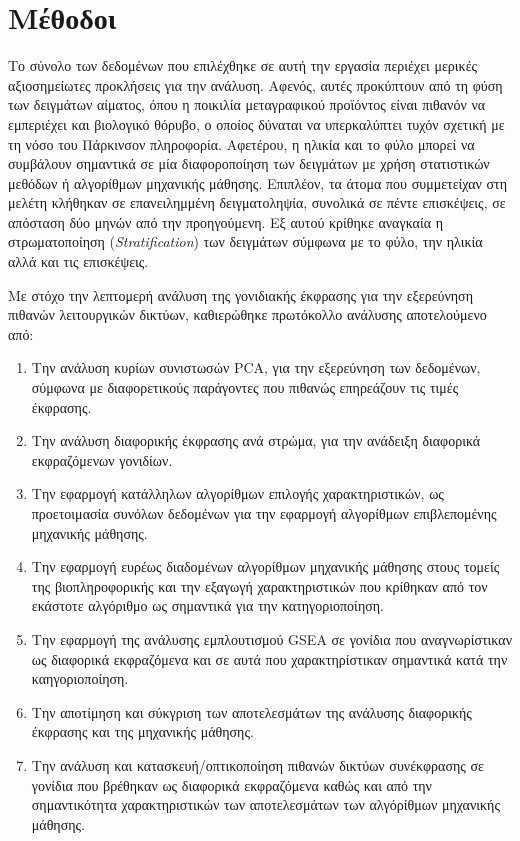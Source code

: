 \documentclass[12pt]{report}
\begin{document}
    \section{Μέθοδοι}
        \par
            Το σύνολο των δεδομένων που επιλέχθηκε σε αυτή την εργασία περιέχει μερικές αξιοσημείωτες προκλήσεις για την ανάλυση. Αφενός, αυτές προκύπτουν από τη φύση των δειγμάτων αίματος, όπου η ποικιλία μεταγραφικού προϊόντος είναι πιθανόν να εμπεριέχει και βιολογικό θόρυβο, ο οποίος δύναται να υπερκαλύπτει τυχόν σχετική με τη νόσο του Πάρκινσον πληροφορία. Αφετέρου, η ηλικία και το φύλο μπορεί να συμβάλουν σημαντικά σε μία διαφοροποίηση των δειγμάτων με χρήση στατιστικών μεθόδων ή αλγορίθμων μηχανικής μάθησης. Επιπλέον, τα άτομα που συμμετείχαν στη μελέτη κλήθηκαν σε επανειλημμένη δειγματοληψία, συνολικά σε πέντε επισκέψεις, σε απόσταση δύο μηνών από την προηγούμενη. Εξ αυτού κρίθηκε αναγκαία η στρωματοποίηση (\emph{Stratification}) των δειγμάτων σύμφωνα με το φύλο, την ηλικία αλλά και τις επισκέψεις.
        \par
            Με στόχο την λεπτομερή ανάλυση της γονιδιακής έκφρασης για την εξερεύνηση πιθανών λειτουργικών δικτύων, καθιερώθηκε πρωτόκολλο ανάλυσης αποτελούμενο από:
            \begin{enumerate}
                \item Την ανάλυση κυρίων συνιστωσών PCA, για την εξερεύνηση των δεδομένων, σύμφωνα με διαφορετικούς παράγοντες που πιθανώς επηρεάζουν τις τιμές έκφρασης.
                \item Την ανάλυση διαφορικής έκφρασης ανά στρώμα, για την ανάδειξη διαφορικά εκφραζόμενων γονιδίων.
                \item Την εφαρμογή κατάλληλων αλγορίθμων επιλογής χαρακτηριστικών, ως προετοιμασία συνόλων δεδομένων για την εφαρμογή αλγορίθμων επιβλεπομένης μηχανικής μάθησης.
                \item Την εφαρμογή ευρέως διαδομένων αλγορίθμων μηχανικής μάθησης στους τομείς της βιοπληροφορικής και την εξαγωγή χαρακτηριστικών που κρίθηκαν από τον εκάστοτε αλγόριθμο ως σημαντικά για την κατηγοριοποίηση.
                \item Την εφαρμογή της ανάλυσης εμπλουτισμού GSEA σε γονίδια που αναγνωρίστικαν ως διαφορικά εκφραζόμενα και σε αυτά που χαρακτηρίστικαν σημαντικά κατά την καηγοριοποίηση.
                \item Την αποτίμηση και σύκγριση των αποτελεσμάτων της ανάλυσης διαφορικής έκφρασης και της μηχανικής μάθησης.
                \item Την ανάλυση και κατασκευή/οπτικοποίηση πιθανών δικτύων συνέκφρασης σε γονίδια που βρέθηκαν ως διαφορικά εκφραζόμενα καθώς και από την σημαντικότητα χαρακτηριστικών των αποτελεσμάτων των αλγόρίθμων μηχανικής μάθησης.
            \end{enumerate}
\end{document}
